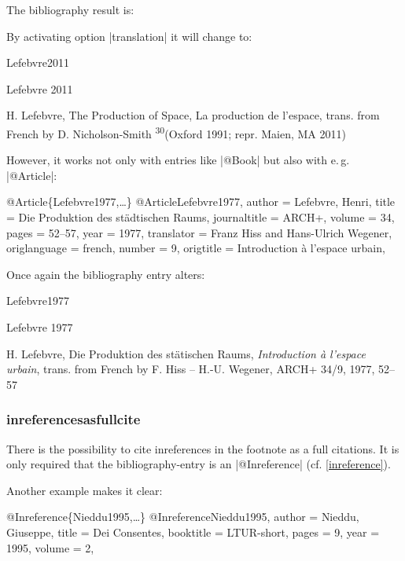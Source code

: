 \documentclass[a4paper,
10pt,
greek,
french,
spanish,
italian,
ngerman,
english,
]{ltxdoc}
\begin{document}
The bibliography result is:

By activating option |translation| it will change to:

\begin{bibbox}{Lefebvre2011}\footnotesize
\parbox[t]{2cm}{Lefebvre 2011} \parbox[t]{9cm}{H. Lefebvre,  The Production of Space, 
{\color{red} La production de l’espace, trans. from French by D. Nicholson-Smith} \textsuperscript{30}(Oxford 1991; repr. Maien, MA 2011)}
\end{bibbox}
 
However, it works not only with entries like |@Book| but also with e.\,g. |@Article|:

\begin{bibexample}[label=Lefebvre1977]{{@}Article\{Lefebvre1977,…\}}
@Article{Lefebvre1977,
  author       = {Lefebvre, Henri},
  title        = {Die Produktion des städtischen Raums},
  journaltitle = {ARCH+},
  volume       = {34},
  pages        = {52--57},
  year         = {1977},
  translator   = {Franz Hiss and Hans-Ulrich Wegener},
  origlanguage = {french},
  number       = {9},
  origtitle    = {Introduction à l'espace urbain},
}
\end{bibexample}

Once again the bibliography entry alters:

\begin{bibbox}{Lefebvre1977}\footnotesize
\parbox[t]{2cm}{Lefebvre 1977} \parbox[t]{9cm}{H. Lefebvre, 
Die Produktion des stätischen Raums, \emph{Introduction à l’espace urbain}, 
{\color{red} trans. from French by F. Hiss -- H.-U. Wegener}, ARCH+ 34/9, 1977, 52–57}
\end{bibbox}

\subsubsection{inreferencesasfullcite}\label{inreferences}
There is the possibility to cite inreferences in the footnote as a full citations.
It is only required that the bibliography-entry is an |@Inreference|  (cf. \cref{inreference}).
 
Another example makes it clear: 
\begin{bibexample}[label=Nieddu1995]{{@}Inreference\{Nieddu1995,…\}}
@Inreference{Nieddu1995,
  author    = {Nieddu, Giuseppe},
  title     = {Dei Consentes},
  booktitle = LTUR-short,
  pages     = {9\psq},
  year      = {1995},
  volume    = {2},
}
\end{bibexample}
\end{document}
